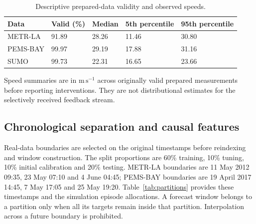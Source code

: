 \documentclass[pdflatex,sn-mathphys-num]{sn-jnl}
\newcommand{\ms}{\mathrm{m\,s^{-1}}}
\begin{document}
\begin{table}[!htbp]
\caption{Descriptive prepared-data validity and observed speeds.}\label{tab:data-statistics}
\centering\setlength{\tabcolsep}{3pt}\small
\begin{tabular}{lllll}\toprule
Data & Valid (\%) & Median & 5th percentile & 95th percentile \\\midrule
METR-LA & 91.89 & 28.26 & 11.46 & 30.80 \\
PEMS-BAY & 99.97 & 29.19 & 17.88 & 31.16 \\
SUMO & 99.73 & 22.31 & 16.65 & 23.66 \\
\bottomrule\end{tabular}
\par\smallskip\footnotesize Speed summaries are in $\ms$ across originally valid prepared measurements before reporting interventions. They are not distributional estimates for the selectively received feedback stream.
\end{table}
\FloatBarrier

\subsection{Chronological separation and causal features}
Real-data boundaries are selected on the original timestamps before reindexing and window construction. The split proportions are 60\% training, 10\% tuning, 10\% initial calibration and 20\% testing. METR-LA boundaries are 11 May 2012 09:35, 23 May 07:10 and 4 June 04:45; PEMS-BAY boundaries are 19 April 2017 14:45, 7 May 17:05 and 25 May 19:20. Table~\ref{tab:partitions} provides these timestamps and the simulation episode allocations. A forecast window belongs to a partition only when all its targets remain inside that partition. Interpolation across a future boundary is prohibited.
\end{document}

